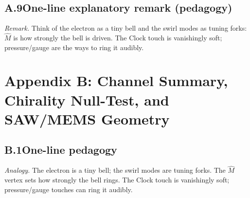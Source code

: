 \documentclass[aps,prb,preprint,amsmath,amssymb]{revtex4-2} %
\begin{document}
    \subsection*{A.9\quad One-line explanatory remark (pedagogy)}
        \emph{Remark.} Think of the electron as a tiny bell and the swirl modes as tuning forks: \(\hat M\) is how strongly the bell is driven. The Clock touch is vanishingly soft; pressure/gauge are the ways to ring it audibly.

\section*{Appendix B: Channel Summary, Chirality Null-Test, and SAW/MEMS Geometry}

    \subsection*{B.1\quad One-line pedagogy}
        \emph{Analogy.} The electron is a tiny bell; the swirl modes are tuning forks. The \(\hat M\) vertex sets how strongly the bell rings. The Clock touch is vanishingly soft; pressure/gauge touches can ring it audibly.
\end{document}
